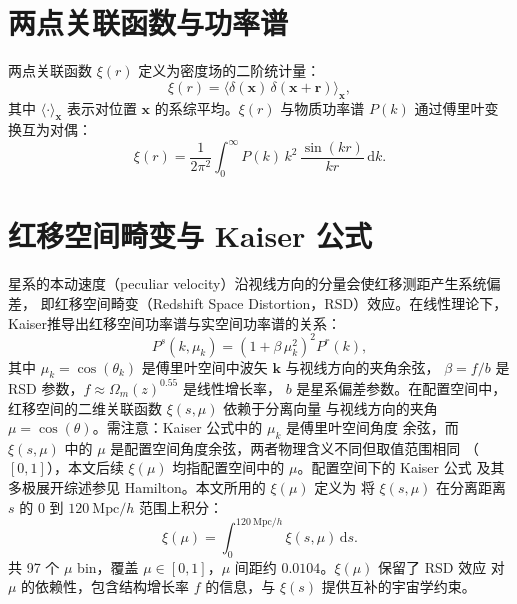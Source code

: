 \section{两点关联函数与功率谱}\label{sec:two-point}

两点关联函数 $\xi(r)$ 定义为密度场的二阶统计量：
\begin{equation}\label{eq:xi-def}
  \xi(r) = \langle \delta(\symbf{x})\, \delta(\symbf{x}+\symbf{r}) \rangle_{\symbf{x}},
\end{equation}
其中 $\langle\cdot\rangle_{\symbf{x}}$ 表示对位置 $\symbf{x}$ 的系综平均。$\xi(r)$ 与物质功率谱
$P(k)$ 通过傅里叶变换互为对偶：
\begin{equation}\label{eq:xi-fft}
  \xi(r) = \frac{1}{2\pi^2}
    \int_0^{\infty} P(k)\, k^2\, \frac{\sin(kr)}{kr}\, \mathrm d k.
\end{equation}

\section{红移空间畸变与 Kaiser 公式}\label{sec:rsd}

星系的本动速度（peculiar velocity）沿视线方向的分量会使红移测距产生系统偏差，
即红移空间畸变（Redshift Space Distortion，RSD）效应。在线性理论下，
Kaiser\cite{Kaiser1987}推导出红移空间功率谱与实空间功率谱的关系：
\begin{equation}\label{eq:kaiser}
  P^{s}(k,\mu_k) = \left(1+\beta\,\mu_k^2\right)^2 P^{r}(k),
\end{equation}
其中 $\mu_k=\cos(\theta_k)$ 是傅里叶空间中波矢 $\symbf{k}$ 与视线方向的夹角余弦，
$\beta=f/b$ 是 RSD 参数，$f\approx \Omega_m(z)^{0.55}$ 是线性增长率\cite{Linder2005}，
$b$ 是星系偏差参数。在配置空间中，红移空间的二维关联函数 $\xi(s,\mu)$ 依赖于分离向量
与视线方向的夹角 $\mu=\cos(\theta)$。需注意：Kaiser 公式中的 $\mu_k$ 是傅里叶空间角度
余弦，而 $\xi(s,\mu)$ 中的 $\mu$ 是配置空间角度余弦，两者物理含义不同但取值范围相同
（$[0,1]$），本文后续 $\xi(\mu)$ 均指配置空间中的 $\mu$。配置空间下的 Kaiser 公式
及其多极展开综述参见 Hamilton\cite{Hamilton1998}。本文所用的 $\xi(\mu)$ 定义为
将 $\xi(s,\mu)$ 在分离距离 $s$ 的 $0$ 到 $120~\mathrm{Mpc}/h$ 范围上积分：
\begin{equation}\label{eq:xi-mu}
  \xi(\mu) = \int_{0}^{120~\mathrm{Mpc}/h} \xi(s,\mu)\, \mathrm d s.
\end{equation}
共 97 个 $\mu$ bin，覆盖 $\mu\in[0,1]$，$\mu$ 间距约 $0.0104$。$\xi(\mu)$ 保留了 RSD 效应
对 $\mu$ 的依赖性，包含结构增长率 $f$ 的信息，与 $\xi(s)$ 提供互补的宇宙学约束。

